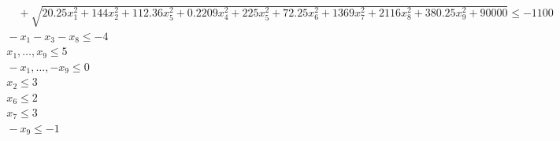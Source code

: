 \documentclass[a4paper,12pt]{article}
\begin{document}
\begin{adjustwidth}{-1.5cm}{}
\begin{tiny}
\[\begin{aligned}
\begin{aligned}
    & \qquad + \sqrt{20.25x_1^2 + 144x_2^2 + 112.36x_5^2 + 0.2209x_4^2 + 225x_5^2 + 72.25x_6^2 + 1369x_7^2 + 2116x_8^2 + 380.25x_9^2 + 90000} \leq -1100 \\
    & \quad -x_1 - x_3 - x_8 \leq -4 \\
    & \quad x_1, \dots, x_9 \leq 5 \\
    & \quad - x_1, \dots, - x_9 \leq 0 \\
    & \quad x_2 \leq 3 \\
    & \quad x_6 \leq 2 \\
    & \quad x_7 \leq 3 \\
    & \quad - x_9 \leq - 1
    \end{aligned}
\end{aligned}
\]
\end{tiny}
\end{adjustwidth}
\end{document}
